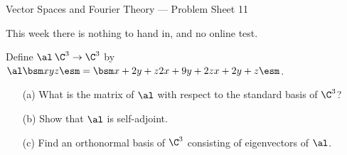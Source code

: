 

\begin{center}
 {\huge Vector Spaces and Fourier Theory ---
   Problem Sheet 11
 }
\end{center}

\begin{rubric}
This week there is nothing to hand in, and no online test.
\end{rubric}

\begin{exercise}
 Define $\al\:\C^3\to\C^3$ by 
 $\displaystyle\al\bsm x\\ y\\ z\esm =
  \bsm x+2y+z\\ 2x+9y+2z\\ x+2y+z\esm$.
 \begin{itemize}
  \item[(a)] What is the matrix of $\al$ with respect to the standard
   basis of $\C^3$?
  \item[(b)] Show that $\al$ is self-adjoint.
  \item[(c)] Find an orthonormal basis of $\C^3$ consisting of
   eigenvectors of $\al$.
 \end{itemize}
\end{exercise}
